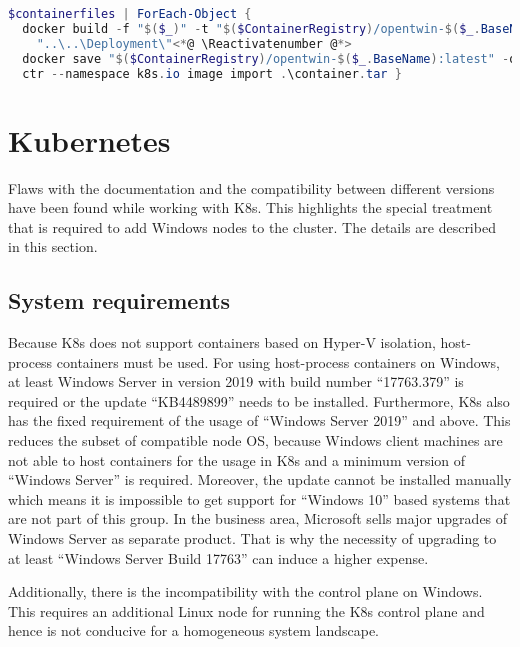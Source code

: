 \begin{lstlisting}[caption={Crucial commands used in the custom PowerShell script to automate process of image building.}, label=lst:results.image_namespace_build, language=powershell, morekeywords={docker, ctr}]
$containerfiles | ForEach-Object {
  docker build -f "$($_)" -t "$($ContainerRegistry)/opentwin-$($_.BaseName):latest" \<*@ \Suppressnumber @*>
    "..\..\Deployment\"<*@ \Reactivatenumber @*>
  docker save "$($ContainerRegistry)/opentwin-$($_.BaseName):latest" -o container.tar
  ctr --namespace k8s.io image import .\container.tar }
\end{lstlisting}


\section{Kubernetes}
Flaws with the documentation and the compatibility between different versions have been found while working with \ac{K8s}. This highlights the special treatment that is required to add \ac{Windows} nodes to the cluster. The details are described in this section.
 
\subsection{System requirements}
Because \ac{K8s} does not support containers based on Hyper-V isolation\cite{Kubernetes.20230227}, host-process containers must be used.
For using host-process containers on \ac{Windows}, at least Windows Server in version 2019 with build number \enquote{17763.379} is required or the update \enquote{KB4489899} needs to be installed\cite{GitHubKubernetesSIGWindowsTools.20230213}. Furthermore, \ac{K8s} also has the fixed requirement of the usage of \enquote{Windows Server 2019} and above\cite{Kubernetes.20230227}. This reduces the subset of compatible node \ac{OS}, because \ac{Windows} client machines are not able to host containers for the usage in \ac{K8s} and a minimum version of \enquote{Windows Server} is required.
Moreover, the update cannot be installed manually which means it is impossible to get support for \enquote{Windows 10} based systems that are not part of this group. In the business area, Microsoft sells major upgrades of Windows Server as separate product. That is why the necessity of upgrading to at least \enquote{Windows Server Build 17763} can induce a higher expense.

Additionally, there is the incompatibility with the control plane on \ac{Windows}. This requires an additional Linux node for running the \ac{K8s} control plane and hence is not conducive for a homogeneous system landscape. 

